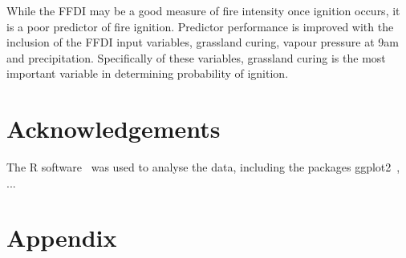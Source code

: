 \documentclass[11pt,a4paper]{article}
\begin{document}
While the FFDI may be a good measure of fire intensity once ignition occurs, it is a poor predictor of fire ignition. Predictor performance is improved with the inclusion of the FFDI input variables, grassland curing, vapour pressure at 9am and precipitation. Specifically of these variables, grassland curing is the most important variable in determining probability of ignition.

\section*{Acknowledgements}

The R software~\citep{CRAN} was used to analyse the data, including the packages ggplot2~\citep{ggplot2}, ...





\section*{Appendix}
\end{document}
